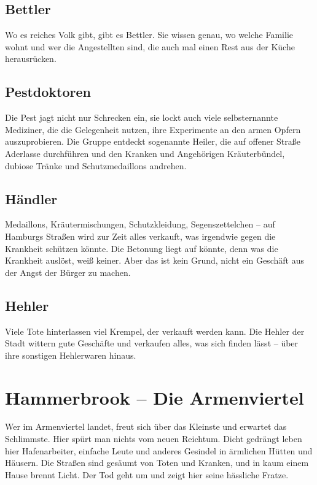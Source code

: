\subsection{Bettler}

Wo es reiches Volk gibt, gibt es Bettler. Sie wissen genau, wo welche Familie wohnt und wer die Angestellten sind, die auch mal einen Rest aus der Küche herausrücken.

\subsection{Pestdoktoren}

Die Pest jagt nicht nur Schrecken ein, sie lockt auch viele selbsternannte Mediziner, die die Gelegenheit nutzen, ihre Experimente an den armen Opfern auszuprobieren. Die Gruppe entdeckt sogenannte Heiler, die auf offener Straße Aderlasse durchführen und den Kranken und Angehörigen Kräuterbündel, dubiose Tränke und Schutzmedaillons andrehen.

\subsection{Händler}

Medaillons, Kräutermischungen, Schutzkleidung, Segenszettelchen – auf Hamburgs Straßen wird zur Zeit alles verkauft, was irgendwie gegen die Krankheit schützen könnte. Die Betonung liegt auf könnte, denn was die Krankheit auslöst, weiß keiner. Aber das ist kein Grund, nicht ein Geschäft aus der Angst der Bürger zu machen.

\subsection{Hehler}

Viele Tote hinterlassen viel Krempel, der verkauft werden kann. Die Hehler der Stadt wittern gute Geschäfte und verkaufen alles, was sich finden lässt – über ihre sonstigen Hehlerwaren hinaus.


\section{Hammerbrook – Die Armenviertel}

Wer im Armenviertel landet, freut sich über das Kleinste und erwartet das Schlimmste. Hier spürt man nichts vom neuen Reichtum. Dicht gedrängt leben hier Hafenarbeiter, einfache Leute und anderes Gesindel in ärmlichen Hütten und Häusern. Die Straßen sind gesäumt von Toten und Kranken, und in kaum einem Hause brennt Licht. Der Tod geht um und zeigt hier seine hässliche Fratze.

